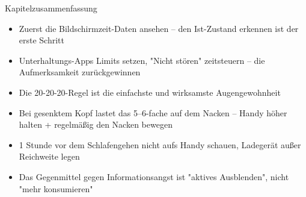 \begin{tcbsummary}{Kapitelzusammenfassung}
\begin{itemize}
  \item Zuerst die Bildschirmzeit-Daten ansehen – den Ist-Zustand erkennen ist der erste Schritt
  \item Unterhaltungs-Apps Limits setzen, "Nicht stören" zeitsteuern – die Aufmerksamkeit zurückgewinnen
  \item Die 20-20-20-Regel ist die einfachste und wirksamste Augengewohnheit
  \item Bei gesenktem Kopf lastet das 5–6-fache auf dem Nacken – Handy höher halten + regelmäßig den Nacken bewegen
  \item 1 Stunde vor dem Schlafengehen nicht aufs Handy schauen, Ladegerät außer Reichweite legen
  \item Das Gegenmittel gegen Informationsangst ist "aktives Ausblenden", nicht "mehr konsumieren"
\end{itemize}

\end{tcbsummary}
